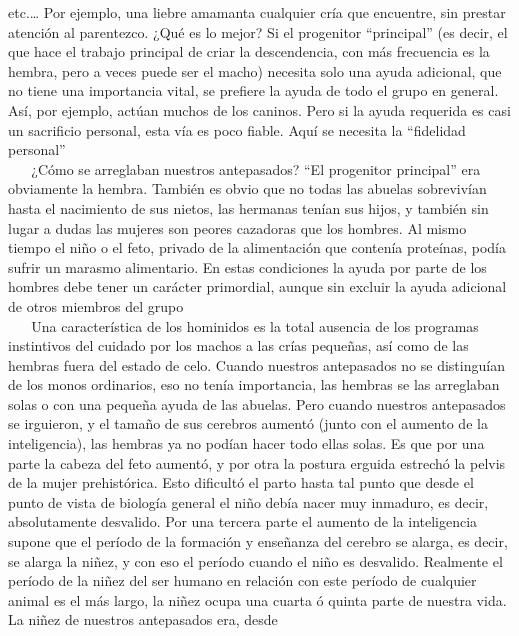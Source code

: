 etc.\ldots{} Por ejemplo, una liebre amamanta cualquier cría que
encuentre, sin prestar atención al parentezco. ¿Qué es lo mejor? Si el
progenitor ``principal'' (es decir, el que hace el trabajo principal de
criar la descendencia, con más frecuencia es la hembra, pero a veces
puede ser el macho) necesita solo una ayuda adicional, que no tiene una
importancia vital, se prefiere la ayuda de todo el grupo en general.
Así, por ejemplo, actúan muchos de los caninos. Pero si la ayuda
requerida es casi un sacrificio personal, esta vía es poco fiable. Aquí
se necesita la ``fidelidad personal''\\
\hspace*{0.333em} ~ ~ ¿Cómo se arreglaban nuestros antepasados? ``El
progenitor principal'' era obviamente la hembra. También es obvio que no
todas las abuelas sobrevivían hasta el nacimiento de sus nietos, las
hermanas tenían sus hijos, y también sin lugar a dudas las mujeres son
peores cazadoras que los hombres. Al mismo tiempo el niño o el feto,
privado de la alimentación que contenía proteínas, podía sufrir un
marasmo alimentario. En estas condiciones la ayuda por parte de los
hombres debe tener un carácter primordial, aunque sin excluir la ayuda
adicional de otros miembros del grupo\\
\hspace*{0.333em} ~ ~ Una característica de los hominidos es la total
ausencia de los programas instintivos del cuidado por los machos a las
crías pequeñas, así como de las hembras fuera del estado de celo. Cuando
nuestros antepasados no se distinguían de los monos ordinarios, eso no
tenía importancia, las hembras se las arreglaban solas o con una pequeña
ayuda de las abuelas. Pero cuando nuestros antepasados se irguieron, y
el tamaño de sus cerebros aumentó (junto con el aumento de la
inteligencia), las hembras ya no podían hacer todo ellas solas. Es que
por una parte la cabeza del feto aumentó, y por otra la postura erguida
estrechó la pelvis de la mujer prehistórica. Esto dificultó el parto
hasta tal punto que desde el punto de vista de biología general el niño
debía nacer muy inmaduro, es decir, absolutamente desvalido. Por una
tercera parte el aumento de la inteligencia supone que el período de la
formación y enseñanza del cerebro se alarga, es decir, se alarga la
niñez, y con eso el período cuando el niño es desvalido. Realmente el
período de la niñez del ser humano en relación con este período de
cualquier animal es el más largo, la niñez ocupa una cuarta ó quinta
parte de nuestra vida. La niñez de nuestros antepasados era, desde
